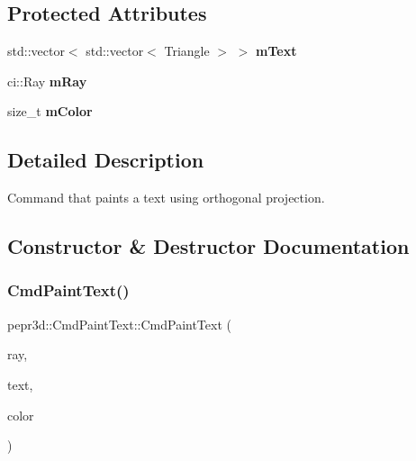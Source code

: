 \subsection*{Protected Attributes}
\begin{DoxyCompactItemize}
\item 
\mbox{\label{classpepr3d_1_1_cmd_paint_text_aab61cd6dc511dd2ac9036a7ce79ea9be}} 
std\+::vector$<$ std\+::vector$<$ Triangle $>$ $>$ {\bfseries m\+Text}
\item 
\mbox{\label{classpepr3d_1_1_cmd_paint_text_a4fbdc99db5de9d1d47214401d84b7aef}} 
ci\+::\+Ray {\bfseries m\+Ray}
\item 
\mbox{\label{classpepr3d_1_1_cmd_paint_text_af80c1d4ae6d3ae3239b8fd390f32be73}} 
size\+\_\+t {\bfseries m\+Color}
\end{DoxyCompactItemize}


\subsection{Detailed Description}
Command that paints a text using orthogonal projection. 

\subsection{Constructor \& Destructor Documentation}
\mbox{\label{classpepr3d_1_1_cmd_paint_text_aab856aaa010955874c11426257d20627}} 
\subsubsection{\texorpdfstring{CmdPaintText()}{CmdPaintText()}}
{\footnotesize\ttfamily pepr3d\+::\+Cmd\+Paint\+Text\+::\+Cmd\+Paint\+Text (\begin{DoxyParamCaption}\item[{ci\+::\+Ray}]{ray,  }\item[{const std\+::vector$<$ std\+::vector$<$ \mbox{\hyperlink{structpepr3d_1_1_font_rasterizer_1_1_tri}{Font\+Rasterizer\+::\+Tri}} $>$$>$ \&}]{text,  }\item[{size\+\_\+t}]{color }\end{DoxyParamCaption})\hspace{0.3cm}{\ttfamily [inline]}}



